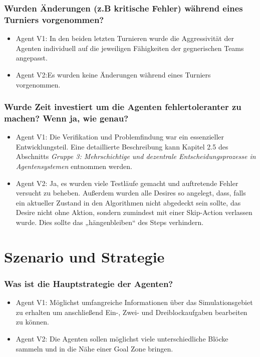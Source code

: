 \documentclass[runningheads]{llncs}
\newcommand{\refMain}{{\textit{Gruppe 3: Mehrschichtige und dezentrale Entscheidungsprozesse in Agentensystemen }}}
\begin{document}
	\subsubsection{Wurden Änderungen (z.B kritische Fehler) während eines Turniers vorgenommen?}
	\begin{itemize}
		\item Agent V1: In den beiden letzten Turnieren wurde die Aggressivität der Agenten individuell auf die jeweiligen Fähigkeiten der gegnerischen Teams angepasst.
		\item Agent V2:Es wurden keine Änderungen während eines Turniers vorgenommen.
	\end{itemize}
	
	\subsubsection{Wurde Zeit investiert um die Agenten fehlertoleranter zu machen? Wenn ja, wie genau?}
	\begin{itemize}
		\item Agent V1: Die Verifikation und Problemfindung war ein essenzieller Entwicklungsteil. Eine detaillierte Beschreibung kann Kapitel 2.5 des Abschnitts \refMain entnommen werden.
		\item Agent V2: Ja, es wurden viele Testläufe gemacht und auftretende Fehler versucht zu beheben. Außerdem wurden alle Desires so angelegt, dass, falls ein aktueller Zustand in den Algorithmen nicht abgedeckt sein sollte, das Desire nicht ohne Aktion, sondern zumindest mit einer Skip-Action verlassen wurde. Dies sollte das „hängenbleiben“ des Steps verhindern.
	\end{itemize}
	
	\section{Szenario und Strategie}
	\subsubsection{Was ist die Hauptstrategie der Agenten?}
	\begin{itemize}
		\item Agent V1: Möglichst umfangreiche Informationen über das Simulationsgebiet zu erhalten um anschließend Ein-, Zwei- und Dreiblockaufgaben bearbeiten zu können.
		\item Agent V2: Die Agenten sollen möglichst viele unterschiedliche Blöcke sammeln und in die Nähe einer Goal Zone bringen.
	\end{itemize}
	
\end{document}
